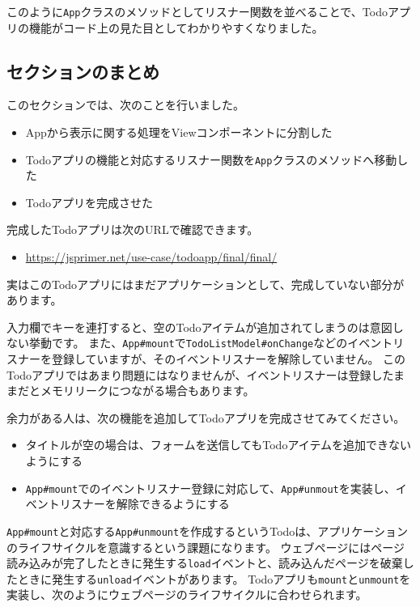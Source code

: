 このように\texttt{App}クラスのメソッドとしてリスナー関数を並べることで、Todoアプリの機能がコード上の見た目としてわかりやすくなりました。

\hypertarget{section-conclusion}{%
\subsection{セクションのまとめ}\label{section-conclusion}}

このセクションでは、次のことを行いました。

\begin{itemize}
\item
  Appから表示に関する処理をViewコンポーネントに分割した
\item
  Todoアプリの機能と対応するリスナー関数を\texttt{App}クラスのメソッドへ移動した
\item
  Todoアプリを完成させた
\end{itemize}

完成したTodoアプリは次のURLで確認できます。

\begin{itemize}
\item
  \url{https://jsprimer.net/use-case/todoapp/final/final/}
\end{itemize}

実はこのTodoアプリにはまだアプリケーションとして、完成していない部分があります。

入力欄でキーを連打すると、空のTodoアイテムが追加されてしまうのは意図しない挙動です。
また、\texttt{App\#mount}で\texttt{TodoListModel\#onChange}などのイベントリスナーを登録していますが、そのイベントリスナーを解除していません。
このTodoアプリではあまり問題にはなりませんが、イベントリスナーは登録したままだとメモリリークにつながる場合もあります。

余力がある人は、次の機能を追加してTodoアプリを完成させてみてください。

\begin{itemize}
\item
  タイトルが空の場合は、フォームを送信してもTodoアイテムを追加できないようにする
\item
  \texttt{App\#mount}でのイベントリスナー登録に対応して、\texttt{App\#unmout}を実装し、イベントリスナーを解除できるようにする
\end{itemize}

\texttt{App\#mount}と対応する\texttt{App\#unmount}を作成するというTodoは、アプリケーションのライフサイクルを意識するという課題になります。
ウェブページにはページ読み込みが完了したときに発生する\texttt{load}イベントと、読み込んだページを破棄したときに発生する\texttt{unload}イベントがあります。
Todoアプリも\texttt{mount}と\texttt{unmount}を実装し、次のようにウェブページのライフサイクルに合わせられます。

